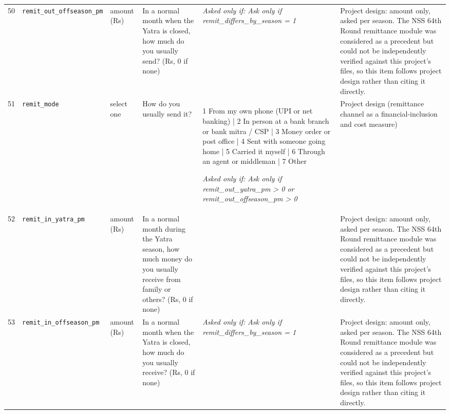 \documentclass[9pt,a4paper,landscape]{article}
\begin{document}
\begin{longtable}{@{}p{0.5cm}p{3.3cm}p{1.7cm}p{7.3cm}p{5.6cm}p{5.4cm}@{}}
\footnotesize 50 & \footnotesize\texttt{remit\_out\_offseason\_pm} & \scriptsize amount (Rs) & \footnotesize In a normal month when the Yatra is closed, how much do you usually send? (Rs, 0 if none)\par\vspace{1pt}{\footnotesize\color{hdr}{\hifont जब यात्रा बंद रहती है, उस आम महीने में कितना भेजते हैं? (रुपये, न भेजते हों तो 0)}} & \scriptsize \textit{Asked only if: Ask only if remit\_differs\_by\_season = 1} & \scriptsize Project design: amount only, asked per season. The NSS 64th Round remittance module was considered as a precedent but could not be independently verified against this project's files, so this item follows project design rather than citing it directly.\\
\footnotesize 51 & \footnotesize\texttt{remit\_mode} & \scriptsize select one & \footnotesize How do you usually send it?\par\vspace{1pt}{\footnotesize\color{hdr}{\hifont आप पैसा आम तौर पर कैसे भेजते हैं?}} & \scriptsize 1 From my own phone (UPI or net banking) | 2 In person at a bank branch or bank mitra / CSP | 3 Money order or post office | 4 Sent with someone going home | 5 Carried it myself | 6 Through an agent or middleman | 7 Other\par\vspace{1pt}\textit{Asked only if: Ask only if remit\_out\_yatra\_pm > 0 or remit\_out\_offseason\_pm > 0} & \scriptsize Project design (remittance channel as a financial-inclusion and cost measure)\\
\footnotesize 52 & \footnotesize\texttt{remit\_in\_yatra\_pm} & \scriptsize amount (Rs) & \footnotesize In a normal month during the Yatra season, how much money do you usually receive from family or others? (Rs, 0 if none)\par\vspace{1pt}{\footnotesize\color{hdr}{\hifont यात्रा के मौसम के आम महीने में, घरवालों या किसी और से आपको कितना पैसा मिलता है? (रुपये, न मिलता हो तो 0)}} & \scriptsize  & \scriptsize Project design: amount only, asked per season. The NSS 64th Round remittance module was considered as a precedent but could not be independently verified against this project's files, so this item follows project design rather than citing it directly.\\
\footnotesize 53 & \footnotesize\texttt{remit\_in\_offseason\_pm} & \scriptsize amount (Rs) & \footnotesize In a normal month when the Yatra is closed, how much do you usually receive? (Rs, 0 if none)\par\vspace{1pt}{\footnotesize\color{hdr}{\hifont जब यात्रा बंद रहती है, उस आम महीने में कितना मिलता है? (रुपये, न मिलता हो तो 0)}} & \scriptsize \textit{Asked only if: Ask only if remit\_differs\_by\_season = 1} & \scriptsize Project design: amount only, asked per season. The NSS 64th Round remittance module was considered as a precedent but could not be independently verified against this project's files, so this item follows project design rather than citing it directly.\\

\end{longtable}
\end{document}
